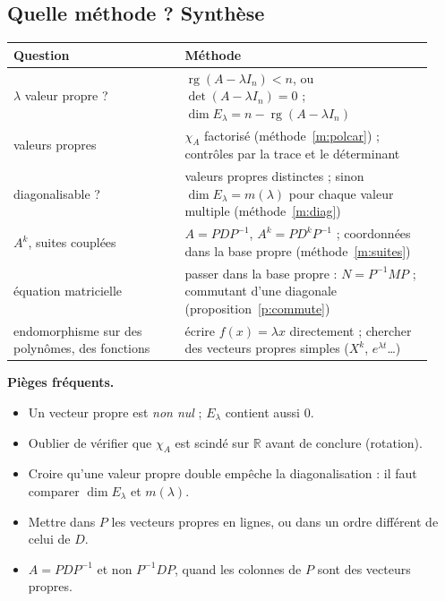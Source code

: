 \documentclass[a4paper,11pt]{article}
\numberwithin{equation}{section}
\numberwithin{figure}{section}
\numberwithin{table}{section}
\theoremstyle{enonce}
\theoremstyle{exemple}
\theoremstyle{remarque}
\newcommand{\R}{\mathbb{R}}
\newcommand{\rg}{\operatorname{rg}}
\begin{document}
\subsection{Quelle méthode ? Synthèse}\label{ss:synthese-red}

\begin{center}
\renewcommand{\arraystretch}{1.35}
\small
\begin{tabular}{p{0.38\linewidth}p{0.55\linewidth}}
\hline
\textbf{Question} & \textbf{Méthode}\\\hline
$\lambda$ valeur propre ? & $\rg(A-\lambda I_n)<n$, ou $\det(A-\lambda I_n)=0$ ; $\dim E_\lambda=n-\rg(A-\lambda I_n)$\\
valeurs propres & $\chi_A$ factorisé (méthode~\ref{m:polcar}) ; contrôles par la trace et le déterminant\\
diagonalisable ? & valeurs propres distinctes ; sinon $\dim E_\lambda=m(\lambda)$ pour chaque valeur multiple (méthode~\ref{m:diag})\\
$A^k$, suites couplées & $A=PDP^{-1}$, $A^k=PD^kP^{-1}$ ; coordonnées dans la base propre (méthode~\ref{m:suites})\\
équation matricielle & passer dans la base propre : $N=P^{-1}MP$ ; commutant d'une diagonale (proposition~\ref{p:commute})\\
endomorphisme sur des polynômes, des fonctions & écrire $f(x)=\lambda x$ directement ; chercher des vecteurs propres simples ($X^k$, $e^{\lambda t}$\dots)\\\hline
\end{tabular}
\end{center}

\begin{attention}\textbf{Pièges fréquents.}
\begin{itemize}[leftmargin=1.1em]
\item Un vecteur propre est \emph{non nul} ; $E_\lambda$ contient aussi $0$.
\item Oublier de vérifier que $\chi_A$ est scindé sur $\R$ avant de conclure (rotation).
\item Croire qu'une valeur propre double empêche la diagonalisation : il faut comparer $\dim E_\lambda$ et $m(\lambda)$.
\item Mettre dans $P$ les vecteurs propres en lignes, ou dans un ordre différent de celui de $D$.
\item $A=PDP^{-1}$ et non $P^{-1}DP$, quand les colonnes de $P$ sont des vecteurs propres.
\end{itemize}
\end{attention}
\end{document}

